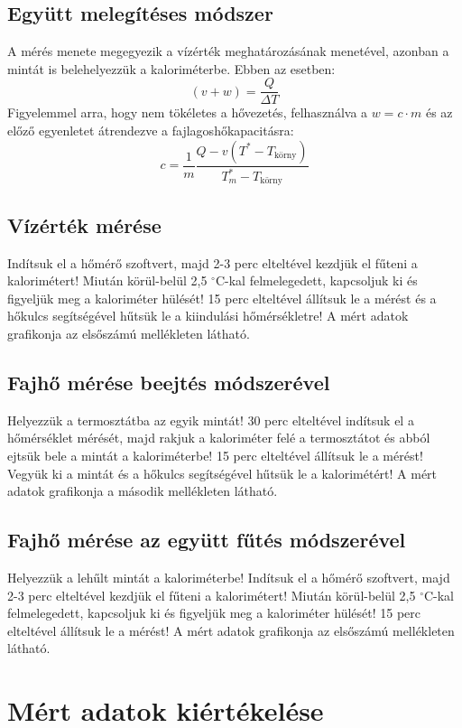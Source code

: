 \documentclass[a4paper, 12pt, oneside]{article}
\begin{document}
\subsection*{Együtt melegítéses módszer}
    A mérés menete megegyezik a vízérték meghatározásának menetével, azonban a mintát is belehelyezzük a kaloriméterbe. Ebben az esetben:
\begin{equation}
    (v + w) = \frac{Q}{\Delta T}
\end{equation}
    Figyelemmel arra, hogy nem tökéletes a hővezetés, felhasználva a $w = c \cdot m$ és az előző egyenletet átrendezve a fajlagoshőkapacitásra:
\begin{equation}
    c = \frac{1}{m} \frac{Q-v (T^*-T_\textrm{körny})}{T_{m}^*-T_\textrm{körny}}
\end{equation}
    

\subsection*{Vízérték mérése}
    Indítsuk el a hőmérő szoftvert, majd 2-3 perc elteltével kezdjük el fűteni a kalorimétert! Miután körül-belül 2,5 $^{\circ}$C-kal felmelegedett, kapcsoljuk ki és figyeljük meg a kaloriméter hülését! 15 perc elteltével állítsuk le a mérést és a hőkulcs segítségével hűtsük le a kiindulási hőmérsékletre! A mért adatok grafikonja az elsőszámú mellékleten látható.
\subsection*{Fajhő mérése beejtés módszerével}
    Helyezzük a termosztátba az egyik mintát! 30 perc elteltével indítsuk el a hőmérséklet mérését, majd rakjuk a kaloriméter felé a termosztátot  és abból ejtsük bele a mintát a kaloriméterbe! 15 perc elteltével állítsuk le a mérést! Vegyük ki a mintát és a hőkulcs segítségével hűtsük le a kalorimétért! A mért adatok grafikonja a második mellékleten látható.
\subsection*{Fajhő mérése az együtt fűtés módszerével}
    Helyezzük a lehűlt mintát a kaloriméterbe! Indítsuk el a hőmérő szoftvert, majd 2-3 perc elteltével kezdjük el fűteni a kalorimétert! Miután körül-belül 2,5 $^{\circ}$C-kal felmelegedett, kapcsoljuk ki és figyeljük meg a kaloriméter hülését! 15 perc elteltével állítsuk le a mérést! A mért adatok grafikonja az elsőszámú mellékleten látható.
\section*{Mért adatok kiértékelése}
\end{document}
